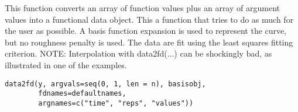 \documentclass{article}
\begin{document}
\begin{Description}\relax
This function converts an array  of function values
plus an array  of argument values into a
functional data object.  This a function that tries to
do as much for the user as possible.  A basis function
expansion is used to represent the curve, but no roughness
penalty is used.  The data are fit using the least squares
fitting criterion.  NOTE:  Interpolation with data2fd(...) can be 
shockingly bad, as illustrated in one of the examples.
\end{Description}
\begin{Usage}
\begin{verbatim}
data2fd(y, argvals=seq(0, 1, len = n), basisobj,
        fdnames=defaultnames,
        argnames=c("time", "reps", "values"))
\end{verbatim}
\end{Usage}
\end{document}
